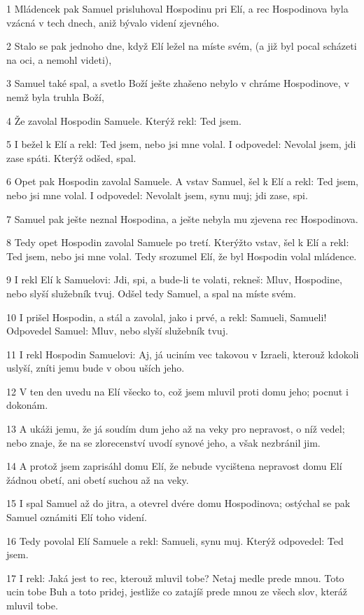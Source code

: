 \par 1 Mládencek pak Samuel prisluhoval Hospodinu pri Elí, a rec Hospodinova byla vzácná v tech dnech, aniž bývalo videní zjevného.
\par 2 Stalo se pak jednoho dne, když Elí ležel na míste svém, (a již byl pocal scházeti na oci, a nemohl videti),
\par 3 Samuel také spal, a svetlo Boží ješte zhašeno nebylo v chráme Hospodinove, v nemž byla truhla Boží,
\par 4 Že zavolal Hospodin Samuele. Kterýž rekl: Ted jsem.
\par 5 I bežel k Elí a rekl: Ted jsem, nebo jsi mne volal. I odpovedel: Nevolal jsem, jdi zase spáti. Kterýž odšed, spal.
\par 6 Opet pak Hospodin zavolal Samuele. A vstav Samuel, šel k Elí a rekl: Ted jsem, nebo jsi mne volal. I odpovedel: Nevolalt jsem, synu muj; jdi zase, spi.
\par 7 Samuel pak ješte neznal Hospodina, a ješte nebyla mu zjevena rec Hospodinova.
\par 8 Tedy opet Hospodin zavolal Samuele po tretí. Kterýžto vstav, šel k Elí a rekl: Ted jsem, nebo jsi mne volal. Tedy srozumel Elí, že byl Hospodin volal mládence.
\par 9 I rekl Elí k Samuelovi: Jdi, spi, a bude-li te volati, rekneš: Mluv, Hospodine, nebo slyší služebník tvuj. Odšel tedy Samuel, a spal na míste svém.
\par 10 I prišel Hospodin, a stál a zavolal, jako i prvé, a rekl: Samueli, Samueli! Odpovedel Samuel: Mluv, nebo slyší služebník tvuj.
\par 11 I rekl Hospodin Samuelovi: Aj, já uciním vec takovou v Izraeli, kterouž kdokoli uslyší, zníti jemu bude v obou uších jeho.
\par 12 V ten den uvedu na Elí všecko to, což jsem mluvil proti domu jeho; pocnut i dokonám.
\par 13 A ukáži jemu, že já soudím dum jeho až na veky pro nepravost, o níž vedel; nebo znaje, že na se zlorecenství uvodí synové jeho, a však nezbránil jim.
\par 14 A protož jsem zaprisáhl domu Elí, že nebude vycištena nepravost domu Elí žádnou obetí, ani obetí suchou až na veky.
\par 15 I spal Samuel až do jitra, a otevrel dvére domu Hospodinova; ostýchal se pak Samuel oznámiti Elí toho videní.
\par 16 Tedy povolal Elí Samuele a rekl: Samueli, synu muj. Kterýž odpovedel: Ted jsem.
\par 17 I rekl: Jaká jest to rec, kterouž mluvil tobe? Netaj medle prede mnou. Toto ucin tobe Buh a toto pridej, jestliže co zatajíš prede mnou ze všech slov, kteráž mluvil tobe.
